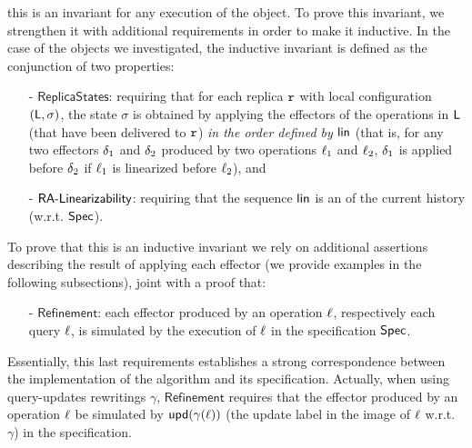 this is an invariant for any execution of the object.
%
To prove this invariant, we strengthen it with additional requirements
in order to make it inductive.
%
In the case of the objects we investigated, the inductive invariant is
defined as the conjunction of two properties:
\begin{itemize}
\item[-] $\mathsf{ReplicaStates}$: requiring that for each replica
  $\mathtt{r}$ with local configuration $(\mathsf{L},\sigma)$, the state
  $\sigma$ is obtained by applying the effectors of the operations
  in $\mathsf{L}$ (that have been delivered to $\mathtt{r}$) \emph{in the order
  defined by $\mathsf{lin}$} (that is, for any two effectors $\delta_1$ and $\delta_2$ produced by two operations $\ell_1$ and $\ell_2$,  
  $\delta_1$ is applied  before $\delta_2$ if $\ell_1$ is linearized before $\ell_2$), and
\item[-] $\mathsf{RA\text{-}Linearizability{}}$: requiring that the sequence
  $\mathsf{lin}$ is an \crdtlinearization{} of the current history (w.r.t.
  $\mathsf{Spec}{}$).
\end{itemize}
To prove that this is an inductive invariant we rely on additional
assertions describing the result of applying each effector (we provide
examples in the following subsections), joint with a proof that:
\begin{itemize}
\item[-] $\mathsf{Refinement}$: each effector produced by an operation
  $\ell$, respectively each query $\ell$, is simulated by the
  execution of $\ell$ in the specification $\mathsf{Spec}$. 
\end{itemize}
Essentially, this last requirements establishes a strong
correspondence between the implementation of the algorithm and its
specification. Actually, when using query-updates rewritings $\gamma$, $\mathsf{Refinement}$ requires that 
the effector produced by an operation $\ell$ be simulated by $\mathsf{upd}(\gamma(\ell))$ 
(the update label in the image of $\ell$ w.r.t. $\gamma$) in the specification. 

